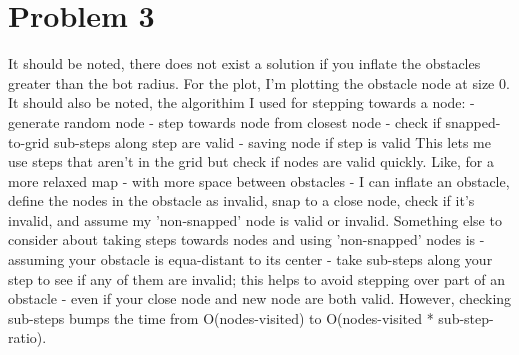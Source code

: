 \documentclass{article}
\begin{document}
        \section*{Problem 3}
            \begin{minipage}{\linewidth}
                \raggedright
                It should be noted, there does not exist a solution if you inflate the obstacles greater than the bot radius. For the plot, I'm plotting the obstacle node at size 0. \break
                \break
                It should also be noted, the algorithim I used for stepping towards a node: \break
                \break
                - generate random node\break
                - step towards node from closest node \break
                - check if snapped-to-grid sub-steps along step are valid \break
                - saving node if step is valid \break
                \break
                This lets me use steps that aren't in the grid but check if nodes are valid quickly. Like, for a more relaxed map - with more space between obstacles - I can inflate an obstacle, define the nodes in the obstacle as invalid, snap to a close node, check if it's invalid, and assume my 'non-snapped' node is valid or invalid.\break
                \break
                Something else to consider about taking steps towards nodes and using 'non-snapped' nodes is - assuming your obstacle is equa-distant to its center - take sub-steps along your step to see if any of them are invalid; this helps to avoid stepping over part of an obstacle - even if your close node and new node are both valid. However, checking sub-steps bumps the time from O(nodes-visited) to O(nodes-visited * sub-step-ratio). \break


\end{minipage}
\end{document}
